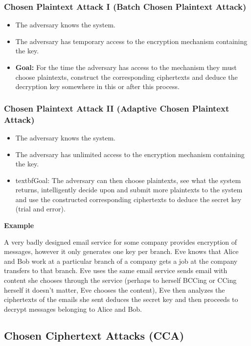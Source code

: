 \subsubsection*{Chosen Plaintext Attack I (Batch Chosen Plaintext Attack)}

\begin{itemize}
\item The adversary knows the system.
\item The adversary has temporary access to the encryption mechanism containing the key.
\item \textbf{Goal:} For the time the adversary has access to the mechanism they must choose plaintexts, construct the corresponding ciphertexts and deduce the decryption key somewhere in this or after this process.
\end{itemize}



\subsubsection*{Chosen Plaintext Attack II (Adaptive Chosen Plaintext Attack)}

\begin{itemize}
\item The adversary knows the system.
\item The adversary has unlimited access to the encryption mechanism containing the key.
\item textbf{Goal:} The adversary can then choose plaintexts, see what the system returns, intelligently decide upon and submit more plaintexts to the system and use the constructed corresponding ciphertexts to deduce the secret key (trial and error).
\end{itemize}

\textbf{Example}


A very badly designed email service for some company provides encryption of messages, however it only generates one key per branch.
Eve knows that Alice and Bob work at a particular branch of a company gets a job at the company transfers to that branch. 
Eve uses the same email service sends email with content she chooses through the service (perhaps to herself BCCing or CCing herself it doesn’t matter, Eve chooses the content), Eve then analyzes the ciphertexts of the emails she sent deduces the secret key and then proceeds to decrypt messages belonging to Alice and Bob. 




\subsection*{Chosen Ciphertext Attacks (CCA)}



